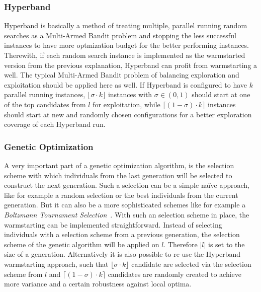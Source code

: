 \subsubsection{Hyperband}
Hyperband is basically a method of treating multiple, parallel running random searches as a Multi-Armed Bandit problem and stopping the less successful instances to have more optmization budget for the better performing instances.
Therewith, if each random search instance is implemented as the warmstarted version from the previous explanation, Hyperband can profit from warmstarting a well.\newline
The typical Multi-Armed Bandit problem of balancing exploration and exploitation should be applied here as well.
If Hyperband is configured to have $k$ parallel running instances, $\lfloor \sigma \cdot k \rfloor$ instances with $\sigma \in (0,1)$ should start at one of the top candidates from $l$ for exploitation, while $\lceil (1 - \sigma) \cdot k \rceil$ instances should start at new and randomly chosen configurations for a better exploration coverage of each Hyperband run.

\subsubsection{Genetic Optimization}
A very important part of a genetic optimization algorithm, is the selection scheme with which individuals from the last generation will be selected to construct the next generation.
Such a selection can be a simple na\"ive approach, like for example a random selection or the best individuals from the current generation.
But it can also be a more sophisticated schemes like for example a \textit{Boltzmann Tournament Selection}~\cite{Goldberg-Boltzmann}.\newline
With such an selection scheme in place, the warmstarting can be implemented straightforward.
Instead of selecting individuals with a selection scheme from a previous generation, the selection scheme of the genetic algorithm will be applied on $l$.
Therefore $|l|$ is set to the size of a generation.\newline
Alternatively it is also possible to re-use the Hyperband warmstarting approach, such that $\lfloor \sigma \cdot k \rfloor$ candidate are selected via the selection scheme from $l$ and $\lceil (1 - \sigma) \cdot k \rceil$ candidates are randomly created to achieve more variance and a certain robustness against local optima.

